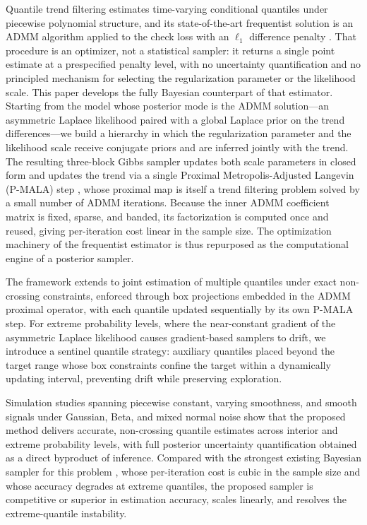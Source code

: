 Quantile trend filtering estimates time-varying conditional quantiles under piecewise polynomial structure, and its state-of-the-art frequentist solution is an ADMM algorithm applied to the check loss with an $\ell_1$ difference penalty \citep{brantley2020baseline}. That procedure is an optimizer, not a statistical sampler: it returns a single point estimate at a prespecified penalty level, with no uncertainty quantification and no principled mechanism for selecting the regularization parameter or the likelihood scale. This paper develops the fully Bayesian counterpart of that estimator. Starting from the model whose posterior mode is the ADMM solution---an asymmetric Laplace likelihood paired with a global Laplace prior on the trend differences---we build a hierarchy in which the regularization parameter and the likelihood scale receive conjugate priors and are inferred jointly with the trend. The resulting three-block Gibbs sampler updates both scale parameters in closed form and updates the trend via a single Proximal Metropolis-Adjusted Langevin (P-MALA) step \citep{pereyra2016proximal}, whose proximal map is itself a trend filtering problem solved by a small number of ADMM iterations. Because the inner ADMM coefficient matrix is fixed, sparse, and banded, its factorization is computed once and reused, giving per-iteration cost linear in the sample size. The optimization machinery of the frequentist estimator is thus repurposed as the computational engine of a posterior sampler.

The framework extends to joint estimation of multiple quantiles under exact non-crossing constraints, enforced through box projections embedded in the ADMM proximal operator, with each quantile updated sequentially by its own P-MALA step. For extreme probability levels, where the near-constant gradient of the asymmetric Laplace likelihood causes gradient-based samplers to drift, we introduce a sentinel quantile strategy: auxiliary quantiles placed beyond the target range whose box constraints confine the target within a dynamically updating interval, preventing drift while preserving exploration.

Simulation studies spanning piecewise constant, varying smoothness, and smooth signals under Gaussian, Beta, and mixed normal noise show that the proposed method delivers accurate, non-crossing quantile estimates across interior and extreme probability levels, with full posterior uncertainty quantification obtained as a direct byproduct of inference. Compared with the strongest existing Bayesian sampler for this problem \citep{onizuka2024fast}, whose per-iteration cost is cubic in the sample size and whose accuracy degrades at extreme quantiles, the proposed sampler is competitive or superior in estimation accuracy, scales linearly, and resolves the extreme-quantile instability.
